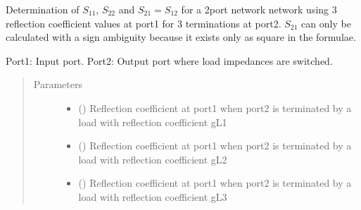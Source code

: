 \documentclass[letterpaper,10pt,english]{sphinxmanual}
\begin{document}

\begin{fulllineitems}
\label{\detokenize{touchstone:touchstone.untermination_method}}
Determination of \(S_{11}\), \(S_{22}\) and \(S_{21}=S_{12}\) for a 2\sphinxhyphen{}port network network using 3 reflection coefficient values at port\sphinxhyphen{}1 for 3 terminations at port\sphinxhyphen{}2. \(S_{21}\) can only be calculated with a sign ambiguity because it exists only as square in the formulae.

Port\sphinxhyphen{}1: Input port.
Port\sphinxhyphen{}2: Output port where load impedances are switched.
\begin{quote}\begin{description}
\item[{Parameters}] \leavevmode\begin{itemize}
\item {} 
 (\sphinxstyleliteralemphasis{\sphinxupquote{, }}) \textendash{} Reflection coefficient at port\sphinxhyphen{}1 when port\sphinxhyphen{}2 is terminated by a load with reflection coefficient gL1

\item {} 
 (\sphinxstyleliteralemphasis{\sphinxupquote{, }}) \textendash{} Reflection coefficient at port\sphinxhyphen{}1 when port\sphinxhyphen{}2 is terminated by a load with reflection coefficient gL2

\item {} 
 (\sphinxstyleliteralemphasis{\sphinxupquote{, }}) \textendash{} Reflection coefficient at port\sphinxhyphen{}1 when port\sphinxhyphen{}2 is terminated by a load with reflection coefficient gL3


\end{itemize}
\end{description}
\end{quote}
\end{fulllineitems}
\end{document}

